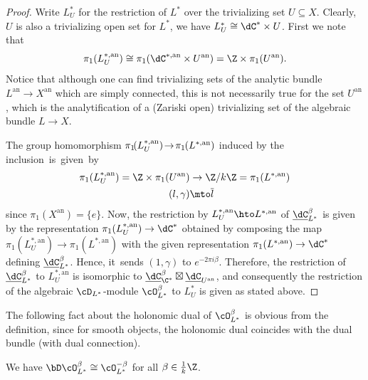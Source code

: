 \begin{proof}
Write $L_U^*$ for the restriction of $L^*$ over the trivializing set $U\subseteq X$. Clearly, $U$ is also a trivializing open set for $L^*$, \ie we have $L^*_{U}\cong \dC^*\times U$. First we note that
\[
\pi_1(L_U^{*,\mathrm{an}})\cong \pi_1(\dC^{*,\mathrm{an}}\times U^{\mathrm{an}})=\Z\times \pi_1(U^\mathrm{an}).
\]
Notice that although one can find trivializing sets of the analytic bundle $L^\mathrm{an}\to X^\mathrm{an}$ which are simply connected, this is not necessarily true for the set $U^\mathrm{an}$, which is the analytification of a (Zariski open) trivializing set of the algebraic bundle $L\to X$.

\Changel%
The group homomorphism $\pi_1\mkern-3mu(L_U^{*,\mathrm{an}}) \mkern-3mu\to\! \pi_1\mkern-1mu(L^{*,\mathrm{an}})$ induced by the inclusion~is~given~by
\begin{align*}
\pi_1(L_U^{*,\mathrm{an}}) = \Z\times \pi_1(U^\mathrm{an}) & \to \Z/k\Z = \pi_1(L^{*,\mathrm{an}}) \\
(l,\gamma) & \mto \overline{l}
\end{align*}\Changelback%
since $\pi_1(X^\mathrm{an})=\{e\}$.
Now, the restriction by $L_U^{*,\mathrm{an}} \hto L^{*,\mathrm{an}}$ of $\underline{\dC}^\beta_{L^*}$ is given by the representation $\pi_1(L_U^{*,\mathrm{an}})\to \dC^*$ obtained by composing the map $\pi_1(L_U^{*,\mathrm{an}}) \to \pi_1(L^{*,\mathrm{an}})$ with the given representation $\pi_1(L^{*,\mathrm{an}})\to \dC^*$ defining $\underline{\dC}^\beta_{L^*}$. Hence, it~sends $(1,\gamma)$ to $e^{-2\pi i \beta}$. Therefore, the restriction of $\underline{\dC}^\beta_{L^*}$ to $L^{*,\mathrm{an}}_U$ is isomorphic to $\underline{\dC}^\beta_{\C^*}\boxtimes \underline{\dC}_{U^\mathrm{an}}$, and consequently the restriction of the algebraic $\cD_{L^*}$\nobreakdash-mod\-ule $\cO_{L^*}^\beta$ to $L_U^*$ is given as stated above.
\end{proof}
The following fact about the holonomic dual of $\cO_{L^*}^\beta$ is obvious from the definition, since for smooth objects, the holonomic dual coincides with the dual bundle (with dual connection).

\begin{lem}\label{lem:OLbetaDual}
We have $\bD \cO_{L^*}^\beta\cong \cO_{L^*}^{-\beta}$
for all $\beta\in \frac{1}{k}\Z$.
\end{lem}

